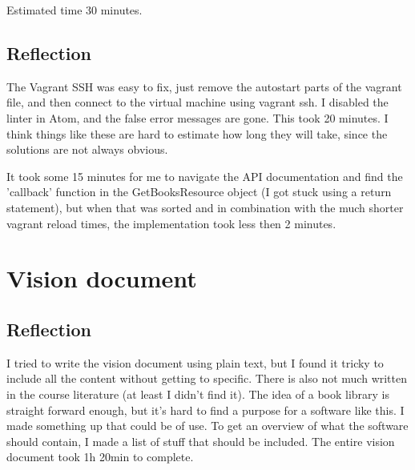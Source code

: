 \documentclass[fleqn,a4paper,11pt]{article}
\begin{document}
Estimated time 30 minutes.

\subsection{Reflection}
The Vagrant SSH was easy to fix, just remove the autostart parts of the vagrant file, and then connect to the virtual machine using vagrant ssh. I disabled the linter in Atom, and the false error messages are gone. This took 20 minutes. I think things like these are hard to estimate how long they will take, since the solutions are not always obvious. 

It took some 15 minutes for me to navigate the API documentation and find the 'callback' function in the GetBooksResource object (I got stuck using a return statement), but when that was sorted and in combination with the much shorter vagrant reload times, the implementation took less then 2 minutes.

\section{Vision document}
\subsection{Reflection}
I tried to write the vision document using plain text, but I found it tricky to include all the content without getting to specific. There is also not much written in the course literature (at least I didn't find it). The idea of a book library is straight forward enough, but it's hard to find a purpose for a software like this. I made something up that could be of use. To get an overview of what the software should contain, I made a list of stuff that should be included. The entire vision document took 1h 20min to complete.
\end{document}
